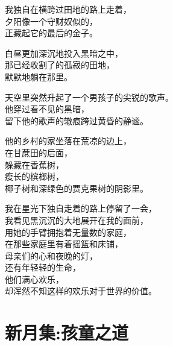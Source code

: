 \documentclass[]{book}
\renewenvironment{quote}{\begin{VF}}{\end{VF}}
\begin{document}
\begin{quote}
我独自在横跨过田地的路上走着，\\
夕阳像一个守财奴似的，\\
正藏起它的最后的金子。

白昼更加深沉地投入黑暗之中，\\
那已经收割了的孤寂的田地，\\
默默地躺在那里。

天空里突然升起了一个男孩子的尖锐的歌声。\\
他穿过看不见的黑暗，\\
留下他的歌声的辙痕跨过黄昏的静谧。

他的乡村的家坐落在荒凉的边上，\\
在甘蔗田的后面，\\
躲藏在香蕉树，\\
瘦长的槟榔树，\\
椰子树和深绿色的贾克果树的阴影里。

我在星光下独自走着的路上停留了一会，\\
我看见黑沉沉的大地展开在我的面前，\\
用她的手臂拥抱着无量数的家庭，\\
在那些家庭里有着摇篮和床铺，\\
母亲们的心和夜晚的灯，\\
还有年轻轻的生命，\\
他们满心欢乐，\\
却浑然不知这样的欢乐对于世界的价值。
\end{quote}

\section{新月集:孩童之道}
\end{document}
